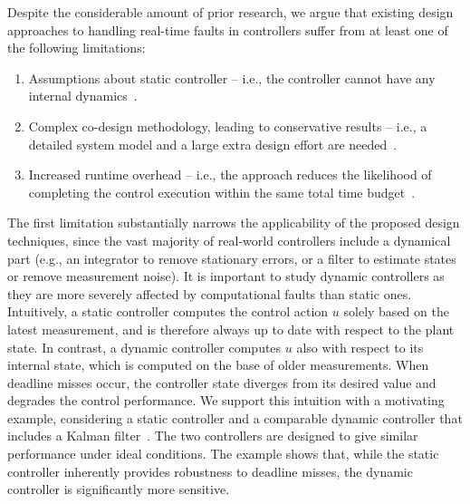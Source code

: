 Despite the considerable amount of prior research, we argue that existing design approaches to handling real-time faults in controllers suffer from at least one of the following limitations:
\begin{enumerate}[label=(\roman*)]
    \item Assumptions about static controller -- i.e., the controller cannot have any internal dynamics~\cite{Ramanathan:1997,Schinkel:2006,Zhang:2010,Chakraborty:2012,Chakraborty:2014,Linsenmayer:2017,Pazzaglia:2019,Maggio:2020}. 
    \item Complex co-design methodology, leading to conservative results -- i.e., a detailed system model and a large extra design effort are needed~\cite{Marti:2001,Schinkel:2006,Chakraborty:2012,Chakraborty:2014,Linsenmayer:2017,Pazzaglia:2021}.
    \item Increased runtime overhead -- i.e., the approach reduces the likelihood of completing the control execution within the same total time budget~\cite{Crespo:1999,Camacho:2010,Caccamo:2000}.
\end{enumerate}

The first limitation substantially narrows the applicability of the proposed design techniques, since the vast majority of real-world controllers include a dynamical part (e.g., an integrator to remove stationary errors, or a filter to estimate states or remove measurement noise).
It is important to study dynamic controllers as they are more severely affected by computational faults than static ones.
Intuitively, a static controller computes the control action $u$ solely based on the latest measurement, and is therefore always up to date with respect to the plant state.
In contrast, a dynamic controller computes $u$ also with respect to its internal state, which is computed on the base of older measurements.
When deadline misses occur, the controller state diverges from its desired value and degrades the control performance.
We support this intuition with a motivating example, considering a static controller and a comparable dynamic controller that includes a Kalman filter~\cite{AstWit:1984}.
The two controllers are designed to give similar performance under ideal conditions. 
The example shows that, while the static controller inherently provides robustness to deadline misses, the dynamic controller is significantly more sensitive.

